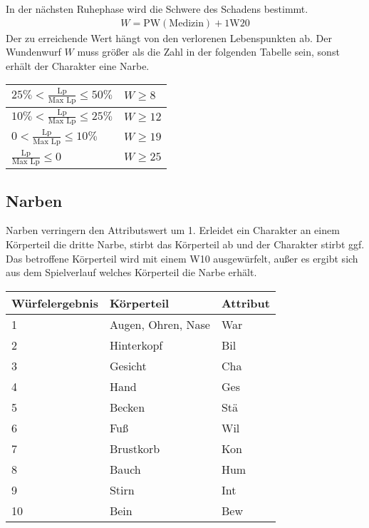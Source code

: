 \documentclass[../../Heldenanleitung2]{subfiles}
\begin{document}
In der nächsten Ruhephase wird die Schwere des Schadens bestimmt.
\begin{align*}
 W = \text{PW}\left(\text{Medizin}\right) + 1\text{W}20
\end{align*}
Der zu erreichende Wert hängt von den verlorenen Lebenspunkten ab. Der Wundenwurf $W$ muss größer als die Zahl in der folgenden Tabelle sein, sonst erhält der Charakter eine Narbe.
\begin{center}
\begin{tabular}{|l|l|}
\hline
$25 \% < \frac{\text{Lp}}{\text{Max Lp}} \le 50 \%$ & $W \ge 8$ \\ \hline
$10 \% < \frac{\text{Lp}}{\text{Max Lp}} \le 25 \%$ & $W \ge 12$ \\ \hline
$0 < \frac{\text{Lp}}{\text{Max Lp}} \le 10 \%$ & $W \ge 19$\\ \hline
$\frac{\text{Lp}}{\text{Max Lp}} \le 0$ & $W \ge 25$\\ \hline
\end{tabular}
\end{center}

\subsection{Narben}
Narben verringern den Attributswert um 1. Erleidet ein Charakter an einem Körperteil die dritte Narbe, stirbt das Körperteil ab und der Charakter stirbt ggf. Das betroffene Körperteil wird mit einem W10 ausgewürfelt, außer es ergibt sich aus dem Spielverlauf welches Körperteil die Narbe erhält.

{
\begin{center}
\begin{tabular}{|l|l|l|}
\hline
Würfelergebnis & Körperteil & Attribut \\ \hline
1 & Augen, Ohren, Nase & War \\ 
2 & Hinterkopf & Bil \\ 
3 & Gesicht & Cha \\ 
4 & Hand & Ges \\ 
5 & Becken & Stä \\ 
6 & Fuß & Wil \\ 
7 & Brustkorb & Kon \\ 
8 & Bauch & Hum \\ 
9 & Stirn & Int \\ 
10 & Bein & Bew \\ \hline
\end{tabular}
\end{center}
}
\end{document}
